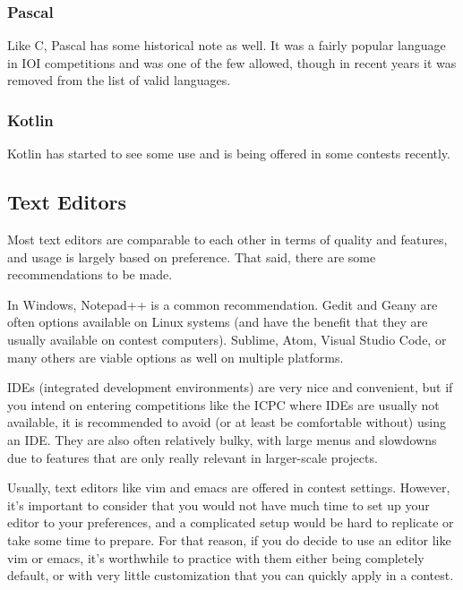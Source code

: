 \subsubsection{Pascal}

Like C, Pascal has some historical note as well. It was a fairly popular language in IOI competitions and was one of the few allowed, though in recent years it was removed from the list of valid languages.

\subsubsection{Kotlin}

Kotlin has started to see some use and is being offered in some contests recently.

\subsection{Text Editors}

Most text editors are comparable to each other in terms of quality and features, and usage is largely based on preference. That said, there are some recommendations to be made.

In Windows, Notepad++ is a common recommendation. Gedit and Geany are often options available on Linux systems (and have the benefit that they are usually available on contest computers). Sublime, Atom, Visual Studio Code, or many others are viable options as well on multiple platforms.

IDEs (integrated development environments) are very nice and convenient, but if you intend on entering competitions like the ICPC where IDEs are usually not available, it is recommended to avoid (or at least be comfortable without) using an IDE. They are also often relatively bulky, with large menus and slowdowns due to features that are only really relevant in larger-scale projects.

Usually, text editors like vim and emacs are offered in contest settings. However, it's important to consider that you would not have much time to set up your editor to your preferences, and a complicated setup would be hard to replicate or take some time to prepare. For that reason, if you do decide to use an editor like vim or emacs, it's worthwhile to practice with them either being completely default, or with very little customization that you can quickly apply in a contest.